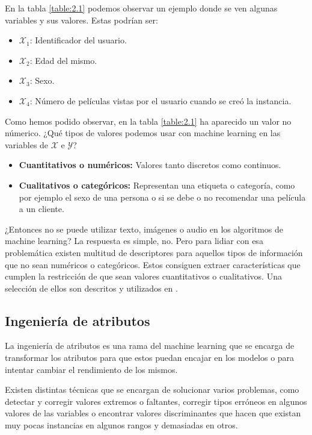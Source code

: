 En la tabla \ref{table:2.1} podemos observar un ejemplo donde se ven algunas variables y sus valores. Estas podrían ser:

\begin{itemize}
\item[\textbullet]$\mathcal{X}_{1}$: Identificador del usuario.
\item[\textbullet]$\mathcal{X}_{2}$: Edad del mismo.
\item[\textbullet]$\mathcal{X}_{3}$: Sexo.
\item[\textbullet]$\mathcal{X}_{4}$: Número de películas vistas por el usuario cuando se creó la instancia.
\end{itemize}

Como hemos podido observar, en la tabla \ref{table:2.1} ha aparecido un valor no númerico. ¿Qué tipos de valores podemos usar con machine learning en las variables de $\mathcal{X}$ e $\mathcal{Y}$?

\begin{itemize}
\item[\textbullet]\textbf{Cuantitativos o numéricos:} Valores tanto discretos como continuos.
\item[\textbullet]\textbf{Cualitativos o categóricos:} Representan una etiqueta o categoría, como por ejemplo el sexo de una persona o si se debe o no recomendar una película a un cliente.
\end{itemize}

¿Entonces no se puede utilizar texto, imágenes o audio en los algoritmos de machine learning? La respuesta es simple, no. Pero para lidiar con esa problemática existen multitud de descriptores para aquellos tipos de información que no sean numéricos o categóricos. Estos consiguen extraer características que cumplen la restricción de que sean valores cuantitativos o cualitativos. Una selección de ellos son descritos y utilizados en \cite{richert2013building}.

\subsection{Ingeniería de atributos} \label{subsec:2.2.1}

La ingeniería de atributos es una rama del machine learning que se encarga de transformar los atributos para que estos puedan encajar en los modelos o para intentar cambiar el rendimiento de los mismos.

Existen distintas técnicas que se encargan de solucionar varios problemas, como detectar y corregir valores extremos o faltantes, corregir tipos erróneos en algunos valores de las variables o encontrar valores discriminantes que hacen que existan muy pocas instancias en algunos rangos y demasiadas en otros.

